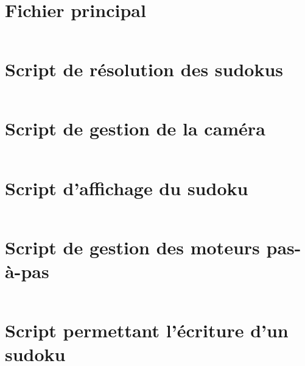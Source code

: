 \printbibliography
\nocite{*}
\appendix

\begin{changemargin}{-2cm}{-4cm}
\chapter{Fichier principal}
\label{main}
\inputminted[fontsize=\scriptsize, linenos=true]{Python}{../script/main.py}
\chapter{Script de résolution des sudokus}
\label{resolution}
\inputminted[fontsize=\scriptsize, linenos=true]{Python}{../script/resolution.py}
\chapter{Script de gestion de la caméra}
\label{camera}
\inputminted[fontsize=\scriptsize, linenos=true]{Python}{../script/camera.py}
\chapter{Script d'affichage du sudoku}
\label{display}
\inputminted[fontsize=\scriptsize, linenos=true]{Python}{../script/display.py}
\chapter{Script de gestion des moteurs pas-à-pas}
\label{step_motor}
\inputminted[fontsize=\scriptsize, linenos=true]{Python}{../script/step_motor.py}
\chapter{Script permettant l'écriture d'un sudoku}
\label{write}
\inputminted[fontsize=\scriptsize, linenos=true]{Python}{../script/write.py}

\end{changemargin}